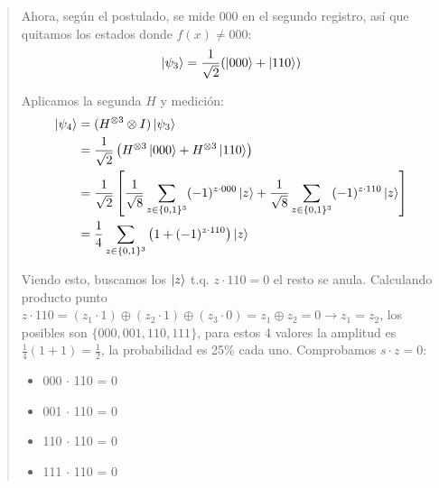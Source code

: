 \begin{quote}
\begin{enumerate}
\begin{itemize}
                Ahora, según el postulado, se mide $000$ en el segundo registro, así que quitamos
                los estados donde $f(x) \not = 000$: 
                $$
                \ket{\psi_3} = \frac{1}{\sqrt{2}}(\ket{000} + \ket{110})
                $$

                Aplicamos la segunda $H$ y medición:
                \begin{align*}
                    \ket{\psi_4} &= (H^{\otimes 3} \otimes I) \ket{\psi_3} \\
                    &= \frac{1}{\sqrt{2}} \left( H^{\otimes 3}\ket{000} + H^{\otimes 3}\ket{110} \right) \\
                    &= \frac{1}{\sqrt{2}} \left[ \frac{1}{\sqrt{8}} \sum_{z \in \{0,1\}^3} (-1)^{z \cdot 000} \ket{z} + \frac{1}{\sqrt{8}} \sum_{z \in \{0,1\}^3} (-1)^{z \cdot 110} \ket{z} \right] \\
                    &= \frac{1}{4} \sum_{z \in \{0,1\}^3} \left( 1 + (-1)^{z \cdot 110} \right) \ket{z}
                \end{align*}

                Viendo esto, buscamos los $\ket{z}$ t.q. $z \cdot 110=0$ el resto se anula.
                Calculando producto punto $z \cdot 110 = (z_1 \cdot 1) \oplus (z_2  \cdot 1) \oplus
                (z_3 \cdot 0) = z_1 \oplus z_2 = 0 \rightarrow z_1=z_2$, los posibles son
                $\{000,001,110,111\}$, para estos 4 valores la amplitud es $\frac{1}{4}(1+1) =
                \frac{1}{2}$, la probabilidad es 25\% cada uno. Comprobamos $s \cdot z = 0$:
                \begin{itemize}
                    \item 000 $\cdot$ 110 = 0
                    \item 001 $\cdot$ 110 = 0
                    \item 110 $\cdot$ 110 = 0
                    \item 111 $\cdot$ 110 = 0
                \end{itemize}
            \end{itemize}
    \end{enumerate}
\end{quote}

\vspace{.5cm}

